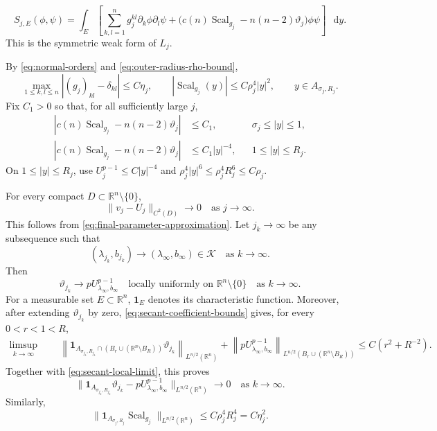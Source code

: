 \documentclass[11pt]{article}
\numberwithin{equation}{section}
\theoremstyle{remark}
\newcommand{\R}{\mathbb R}
\newcommand{\norm}[1]{\lVert #1\rVert}
\newcommand{\dd}{\mathop{}\!\mathrm{d}}
\begin{document}
\[
  S_{j,E}(\phi,\psi)=\int_E\left[
 \sum_{k,l=1}^ng_j^{kl}\partial_k\phi\partial_l\psi
 +\bigl(c(n)\operatorname{Scal}_{g_j}-n(n-2)\vartheta_j\bigr)\phi\psi
 \right]\,\dd y.
\]
This is the symmetric weak form of  \( L_j\).

By \eqref{eq:normal-orders} and \eqref{eq:outer-radius-rho-bound},
\begin{equation}\label{eq:scaled-metric-coefficient-bounds}
 \max_{1\le k,l\le n}|(g_j)_{kl}-\delta_{kl}|\le C\eta_j,
 \qquad |\operatorname{Scal}_{g_j}(y)|\le C\rho_j^4|y|^2,
 \qquad y\in A_{\sigma_j,R_j}.
\end{equation}
Fix \(C_1>0\) so that, for all sufficiently large \(j\),
\begin{equation}\label{eq:secant-potential-regions}
 \begin{aligned}
 |c(n)\operatorname{Scal}_{g_j}-n(n-2)\vartheta_j|&\le C_1,
 &&\sigma_j\le|y|\le1,\\
 |c(n)\operatorname{Scal}_{g_j}-n(n-2)\vartheta_j|&\le C_1|y|^{-4},
 &&1\le|y|\le R_j.
 \end{aligned}
\end{equation}
On \(1\le|y|\le R_j\), use \(U_j^{p-1}\le C|y|^{-4}\) and
\(\rho_j^4|y|^6\le\rho_j^4R_j^6\le C\rho_j\).

For every compact \(D\subset\R^n\setminus\{0\}\),
\[
 \norm{v_j-U_j}_{C^2(D)}\to0
 \quad\text{as }j\to\infty.
\]
This follows from \eqref{eq:final-parameter-approximation}.
Let \(j_k\to\infty\) be any subsequence such that
\[
 (\lambda_{j_k},b_{j_k})
 \to(\lambda_\infty,b_\infty)\in\mathcal K
 \quad\text{as }k\to\infty.
\]
Then
\begin{equation}\label{eq:secant-local-limit}
 \vartheta_{j_k}\to pU_{\lambda_\infty,b_\infty}^{p-1}
 \quad\text{locally uniformly on }\R^n\setminus\{0\}
 \quad\text{as }k\to\infty.
\end{equation}
For a measurable set \(E\subset\R^n\), \(\mathbf1_E\) denotes its
characteristic function. Moreover, after extending \(\vartheta_{j_k}\) by zero,
\eqref{eq:secant-coefficient-bounds} gives, for every
\(0<r<1<R\),
\[
 \begin{aligned}
 \limsup_{k\to\infty}\;&\phantom{{}+{}}
 \left\|
 \mathbf1_{A_{\sigma_{j_k},R_{j_k}}\cap
 (B_r\cup(\R^n\setminus B_R))}\vartheta_{j_k}
 \right\|_{L^{n/2}(\R^n)}+
 \left\|
 pU_{\lambda_\infty,b_\infty}^{p-1}
 \right\|_{L^{n/2}(B_r\cup(\R^n\setminus B_R))}
 \le C(r^2+R^{-2}).
 \end{aligned}
\]
Together with \eqref{eq:secant-local-limit}, this proves
\[
 \norm{\mathbf1_{A_{\sigma_{j_k},R_{j_k}}}\vartheta_{j_k}
 -pU_{\lambda_\infty,b_\infty}^{p-1}}
 _{L^{n/2}(\R^n)}\to0
 \quad\text{as }k\to\infty.
\]
Similarly,
\begin{equation}\label{eq:scalar-curvature-Ln2-small}
 \norm{\mathbf1_{A_{\sigma_j,R_j}}\operatorname{Scal}_{g_j}}_{L^{n/2}(\R^n)}
 \le C\rho_j^4R_j^4=C\eta_j^2.
\end{equation}
\end{document}
